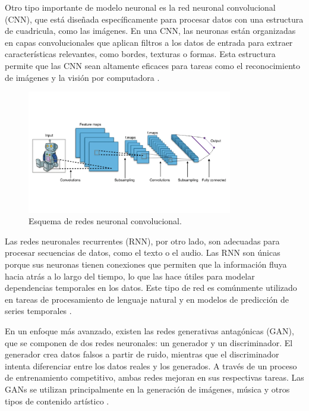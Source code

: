Otro tipo importante de modelo neuronal es la red neuronal convolucional (CNN), que está diseñada específicamente para procesar datos con una estructura de cuadricula, como las imágenes. En una CNN, las neuronas están organizadas en capas convolucionales que aplican filtros a los datos de entrada para extraer características relevantes, como bordes, texturas o formas. Esta estructura permite que las CNN sean altamente eficaces para tareas como el reconocimiento de imágenes y la visión por computadora \cite{goodfellow2016deep}.


\begin{figure}[H]
    \centering
    \includegraphics[width=0.8\textwidth]{./img/modelo/CNN.png}
    \caption{Esquema de redes neuronal convolucional. \cite{uniteai2020cnn}}
    \label{fig:esq-CNN}
\end{figure}


Las redes neuronales recurrentes (RNN), por otro lado, son adecuadas para procesar secuencias de datos, como el texto o el audio. Las RNN son únicas porque sus neuronas tienen conexiones que permiten que la información fluya hacia atrás a lo largo del tiempo, lo que las hace útiles para modelar dependencias temporales en los datos. Este tipo de red es comúnmente utilizado en tareas de procesamiento de lenguaje natural y en modelos de predicción de series temporales \cite{haykin2009neural}.

En un enfoque más avanzado, existen las redes generativas antagónicas (GAN), que se componen de dos redes neuronales: un generador y un discriminador. El generador crea datos falsos a partir de ruido, mientras que el discriminador intenta diferenciar entre los datos reales y los generados. A través de un proceso de entrenamiento competitivo, ambas redes mejoran en sus respectivas tareas. Las GANs se utilizan principalmente en la generación de imágenes, música y otros tipos de contenido artístico \cite{nielsen2015neural}.

